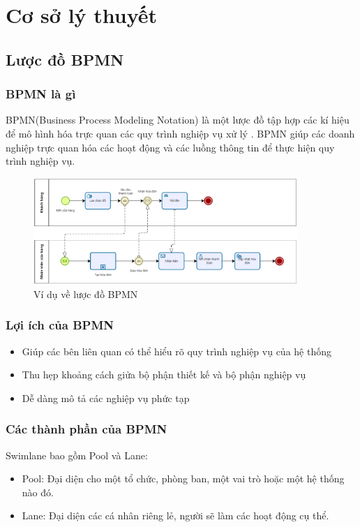 \section{Cơ sở lý thuyết}
\subsection{Lược đồ BPMN}
\subsubsection{BPMN là gì}

\hspace*{0.5cm}BPMN(Business Process Modeling Notation) là một lược đồ tập hợp các kí hiệu để mô hình hóa trực quan các quy trình nghiệp vụ xử lý . BPMN giúp các doanh nghiệp trực quan hóa các hoạt động và các luồng thông tin để thực hiện quy trình nghiệp vụ.
\begin{figure}[!htp]
	\centering
	\includegraphics[width=10cm]{img/theory/BPMN/BPMN_sample.png}
	\newline
	\caption{Ví dụ về lược đồ BPMN}
\end{figure}



\subsubsection{Lợi ích của BPMN}
\begin{itemize}
	\item Giúp các bên liên quan có thể hiểu rõ quy trình nghiệp vụ của hệ thống
	\item Thu hẹp khoảng cách giửa bộ phận thiết kế và bộ phận nghiệp vụ
	\item Dễ dàng mô tả các nghiệp vụ phức tạp
\end{itemize}

\subsubsection{Các thành phần của BPMN}
Swimlane bao gồm Pool và Lane:
\begin{itemize}
	\item Pool: Đại diện cho một tổ chức, phòng ban, một vai trò hoặc một hệ thống nào đó.
	\item Lane: Đại diện các cá nhân riêng lẻ, người sẽ làm các hoạt động cụ thể.
\end{itemize}

